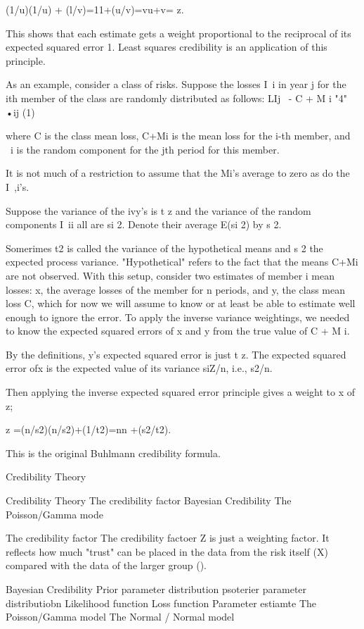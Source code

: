   (1/u)(1/u) + (l/v)=11+(u/v)=vu+v= z.

This shows that each estimate gets a weight proportional to the reciprocal of its expected squared error 1. Least squares credibility is
an application of this principle.

As an example, consider a class of risks. Suppose the losses I~i in year j for the ith member of the
class are randomly distributed as follows:
LIj ~- C + M i "4" •ij (1)

where C is the class mean loss, C+Mi is the mean loss for the i-th member, and ~i is the random
component for the jth period for this member. 

It is not much of a restriction to assume that the Mi's average to zero as do the I~,i's. 

Suppose the variance of the ivy's is t z and the variance of the random components I~ii all are si 2. Denote their average E(si 2) by s 2.

Somerimes t2 is called the variance of the hypothetical means and s 2 the expected process variance.
"Hypothetical" refers to the fact that the means C+Mi are not observed.
With this setup, consider two estimates of member i mean losses: x, the average losses of the
member for n periods, and y, the class mean loss C, which for now we will assume to know or at
least be able to estimate well enough to ignore the error. To apply the inverse variance weightings,
we needed to know the expected squared errors of x and y from the true value of C + M i.

By the definitions, y's expected squared error is just t z. The expected squared error ofx is the
expected value of its variance siZ/n, i.e., s2/n. 

Then applying the inverse expected squared error principle gives a weight to x of z;

	z =(n/s2)(n/s2)+(1/t2)=nn +(s2/t2). 

This is the original
Buhlmann credibility formula.


Credibility Theory

Credibility Theory
The credibility factor
Bayesian Credibility
The Poisson/Gamma mode
 
The credibility factor
The credibility factoer Z is just a weighting factor. It reflects how much "trust" can be placed in the data from the risk itself (X) compared with the data of the larger group ().
 
Bayesian Credibility
Prior parameter distribution
psoterier parameter distributiobn
Likelihood function
Loss function
Parameter estiamte
The Poisson/Gamma model
The Normal / Normal model
 
 
